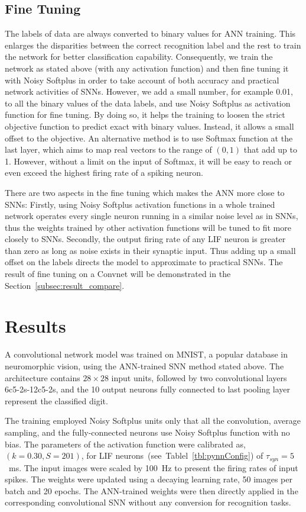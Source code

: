 	
	\subsection{Fine Tuning}
	The labels of data are always converted to binary values for ANN training.
	This enlarges the disparities between the correct recognition label and the rest to train the network for better classification capability.
	Consequently, we train the network as stated above (with any activation function) and then fine tuning it with Noisy Softplus in order to take account of both accuracy and practical network activities of SNNs.
	However, we add a small number, for example 0.01, to all the binary values of the data labels, and use Noisy Softplus as activation function for fine tuning. 
	By doing so, it helps the training to loosen the strict objective function to predict exact with binary values.
	Instead, it allows a small offset to the objective.
	An alternative method is to use Softmax function at the last layer, which aims to map real vectors to the range of $(0,1)$ that add up to 1. 
	However, without a limit on the input of Softmax, it will be easy to reach or even exceed the highest firing rate of a spiking neuron.
	
	There are two aspects in the fine tuning which makes the ANN more close to SNNs:
	Firstly, using Noisy Softplus activation functions in a whole trained network operates every single neuron running in a similar noise level as in SNNs, thus the weights trained by other activation functions will be tuned to fit more closely to SNNs.
	Secondly, the output firing rate of any LIF neuron is greater than zero as long as noise exists in their synaptic input.
	Thus adding up a small offset on the labels directs the model to approximate to practical SNNs. 
	The result of fine tuning on a Convnet will be demonstrated in the Section~\ref{subsec:result_compare}.
	
	
\section{Results}
\label{sec:iconipResult}
	A convolutional network model was trained on MNIST,
	a popular database in neuromorphic vision, using the ANN-trained SNN method stated above.
	The architecture contains $28\times28$ input units, followed by two convolutional layers 6c5-2s-12c5-2s, and the 10 output neurons fully connected to last pooling layer represent the classified digit.
	
	The training employed Noisy Softplus units only that all the convolution, average sampling, and the fully-connected neurons use Noisy Softplus function with no bias.
	The parameters of the activation function were calibrated as, $(k=0.30, S=201)$,  for LIF neurons~(see~Tablel~\ref{tbl:pynnConfig}) of $\tau_{syn}=5$~ms.
	The input images were scaled by 100~Hz to present the firing rates of input spikes.
	The weights were updated using a decaying learning rate, 50 images per batch and 20 epochs.
	The ANN-trained weights were then directly applied in the corresponding convolutional SNN without any conversion for recognition tasks.
	
